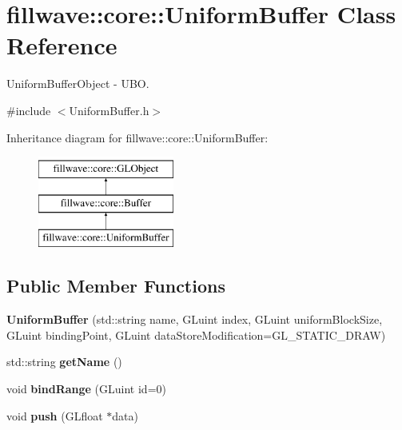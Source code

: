 \hypertarget{classfillwave_1_1core_1_1UniformBuffer}{}\section{fillwave\+:\+:core\+:\+:Uniform\+Buffer Class Reference}
\label{classfillwave_1_1core_1_1UniformBuffer}


Uniform\+Buffer\+Object -\/ U\+B\+O.  




{\ttfamily \#include $<$Uniform\+Buffer.\+h$>$}

Inheritance diagram for fillwave\+:\+:core\+:\+:Uniform\+Buffer\+:\begin{figure}[H]
\begin{center}
\leavevmode
\includegraphics[height=3.000000cm]{classfillwave_1_1core_1_1UniformBuffer}
\end{center}
\end{figure}
\subsection*{Public Member Functions}
\begin{DoxyCompactItemize}
\item 
\hypertarget{classfillwave_1_1core_1_1UniformBuffer_aece4fd075b358a2180adb8558382722c}{}{\bfseries Uniform\+Buffer} (std\+::string name, G\+Luint index, G\+Luint uniform\+Block\+Size, G\+Luint binding\+Point, G\+Luint data\+Store\+Modification=G\+L\+\_\+\+S\+T\+A\+T\+I\+C\+\_\+\+D\+R\+A\+W)\label{classfillwave_1_1core_1_1UniformBuffer_aece4fd075b358a2180adb8558382722c}

\item 
\hypertarget{classfillwave_1_1core_1_1UniformBuffer_a8958a752bdfd94297bc1431ae4f4b2c0}{}std\+::string {\bfseries get\+Name} ()\label{classfillwave_1_1core_1_1UniformBuffer_a8958a752bdfd94297bc1431ae4f4b2c0}

\item 
\hypertarget{classfillwave_1_1core_1_1UniformBuffer_a299d025ba466eb078cf675e85478b6a8}{}void {\bfseries bind\+Range} (G\+Luint id=0)\label{classfillwave_1_1core_1_1UniformBuffer_a299d025ba466eb078cf675e85478b6a8}

\item 
\hypertarget{classfillwave_1_1core_1_1UniformBuffer_ae274328844f87ee69ff64e554ab31294}{}void {\bfseries push} (G\+Lfloat $\ast$data)\label{classfillwave_1_1core_1_1UniformBuffer_ae274328844f87ee69ff64e554ab31294}

\end{DoxyCompactItemize}
